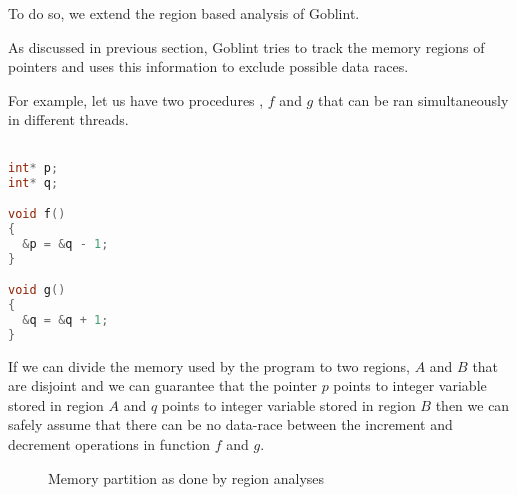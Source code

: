 \documentclass[..thesis.tex]{subfiles}
\begin{document}

To do so, we extend the region based analysis of Goblint.


As discussed in previous section, Goblint tries to track the memory regions of pointers and uses this information to exclude possible data races.


For example, let us have two procedures , $f$ and $g$ that can be ran simultaneously in different threads.

\begin{lstlisting}[language=c,style=def]

int* p;
int* q;

void f()
{
  &p = &q - 1; 
}

void g()
{
  &q = &q + 1; 
}

\end{lstlisting}

 

 If we can divide the memory used by the program to two regions, $A$ and $B$ that are disjoint and we can guarantee that the pointer $p$ points to integer variable stored in region $A$ and $q$ points to integer variable stored in region $B$ then we can safely assume that there can be no data-race between the increment and decrement operations in function $f$ and $g$.

\begin{figure}[H]
  \centering
    \caption{Memory partition as done by region analyses}
\end{figure}
\end{document}
